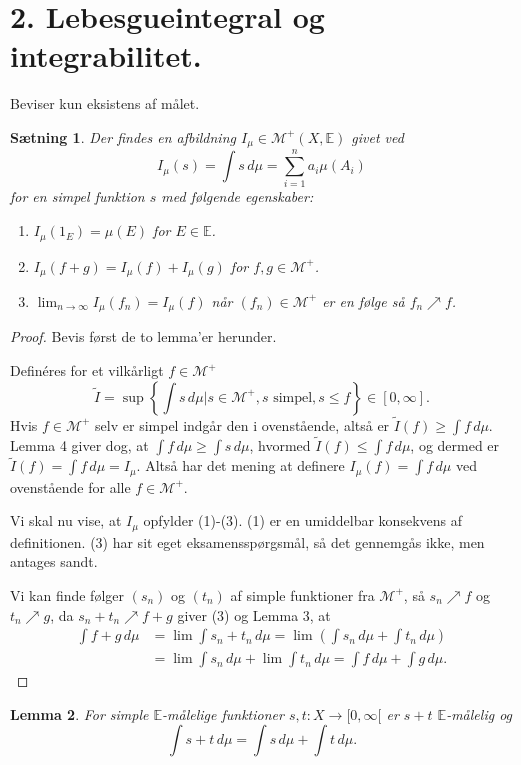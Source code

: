 \documentclass[12pt]{report}
\newtheorem{lemma}{Lemma}
\newtheorem{theorem}[lemma]{Sætning}
\theoremstyle{break}
\newtheorem*{proof}{Bevis}
\theoremstyle{break}
\newcommand{\Int}[1]{\int#1\,d\mu}
\newcommand{\EE}{\mathbb{E}}
\newcommand{\M}{\mathcal{M}^+}
\newcommand{\1}{\mathds{1}}
\begin{document}
\section*{2. Lebesgueintegral og integrabilitet.}
Beviser kun eksistens af målet.
\begin{theorem}
Der findes en afbildning $I_\mu\in\M(X,\EE)$ givet ved
\[I_\mu(s)=\Int{s}=\sum_{i=1}^{n}a_i\mu(A_i)\] for en simpel funktion $s$ med følgende egenskaber:
\begin{enumerate}
\item $I_\mu(1_E)=\mu(E)$ for $E\in\EE$.
\item $I_\mu(f+g)=I_\mu(f)+I_\mu(g)$ for $f,g\in\M$.
\item $\lim_{n\to\infty}I_\mu(f_n)=I_\mu(f)$ når $(f_n)\in\M$ er en følge så $f_n\nearrow f$.
\end{enumerate}
\end{theorem}
\begin{proof}
Bevis først de to lemma'er herunder.

\bigskip

Definéres for et vilkårligt $f\in\M$
\[\tilde{I}=\sup\left\{\Int{s}\vert s\in\M, s\text{ simpel},s\leq f\right\}\in[0,\infty].\]
Hvis $f\in\M$ selv er simpel indgår den i ovenstående, altså er $\tilde{I}(f)\geq\Int{f}$. Lemma 4 giver dog, at $\Int{f}\geq\Int{s}$, hvormed  $\tilde{I}(f)\leq \Int{f}$, og dermed er $\tilde{I}(f)=\Int{f} = I_\mu$. Altså har det mening at definere $I_\mu(f)=\Int{f}$ ved ovenstående for alle $f\in\M$.

\bigskip

Vi skal nu vise, at $I_\mu$ opfylder (1)-(3). (1) er en umiddelbar konsekvens af definitionen. (3) har sit eget eksamensspørgsmål, så det gennemgås ikke, men antages sandt. 

\bigskip

Vi kan finde følger $(s_n)$ og $(t_n)$ af simple funktioner fra $\M$, så $s_n\nearrow f$ og $t_n\nearrow g$, da $s_n+t_n\nearrow f+g$ giver (3) og Lemma 3, at
\begin{align*}
\Int{f+g}&=\lim\Int{s_n+t_n}=\lim\left(\Int{s_n}+\Int{t_n}\right) \\ & = \lim\Int{s_n}+\lim\Int{t_n}=\Int{f}+\Int{g}.
\end{align*}
\end{proof}
\begin{lemma}
For simple $\EE$-målelige funktioner $s,t\colon X\to[0,\infty[$ er $s+t$ $\EE$-målelig og \[\Int{s+t}=\Int{s}+\Int{t}.\]
\end{lemma}
\end{document}
